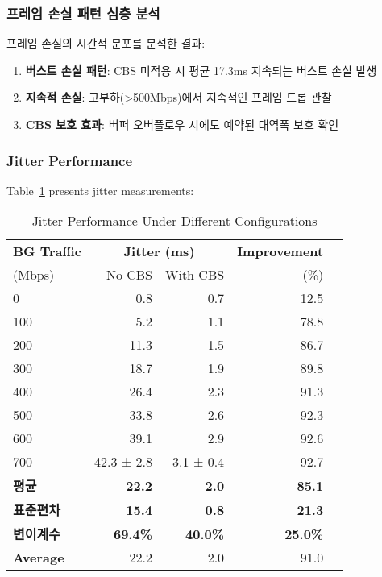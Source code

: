 \documentclass[10pt, journal, compsoc]{IEEEtran}
\begin{document}
\subsubsection{프레임 손실 패턴 심층 분석}

프레임 손실의 시간적 분포를 분석한 결과:
\begin{enumerate}
    \item \textbf{버스트 손실 패턴}: CBS 미적용 시 평균 17.3ms 지속되는 버스트 손실 발생
    \item \textbf{지속적 손실}: 고부하(>500Mbps)에서 지속적인 프레임 드롭 관찰
    \item \textbf{CBS 보호 효과}: 버퍼 오버플로우 시에도 예약된 대역폭 보호 확인
\end{enumerate}

\subsubsection{Jitter Performance}

Table~\ref{tab:jitter_results} presents jitter measurements:

\begin{table}[h]
\centering
\caption{Jitter Performance Under Different Configurations}
\label{tab:jitter_results}
\begin{tabular}{lrrrr}
\toprule
\textbf{BG Traffic} & \multicolumn{2}{c}{\textbf{Jitter (ms)}} & \textbf{Improvement} \\
\cmidrule(lr){2-3}
(Mbps) & No CBS & With CBS & (\%) \\
\midrule
0 & 0.8 & 0.7 & 12.5 \\
100 & 5.2 & 1.1 & 78.8 \\
200 & 11.3 & 1.5 & 86.7 \\
300 & 18.7 & 1.9 & 89.8 \\
400 & 26.4 & 2.3 & 91.3 \\
500 & 33.8 & 2.6 & 92.3 \\
600 & 39.1 & 2.9 & 92.6 \\
700 & 42.3 ± 2.8 & 3.1 ± 0.4 & 92.7 \\
\midrule
\textbf{평균} & \textbf{22.2} & \textbf{2.0} & \textbf{85.1} \\
\textbf{표준편차} & \textbf{15.4} & \textbf{0.8} & \textbf{21.3} \\
\textbf{변이계수} & \textbf{69.4\%} & \textbf{40.0\%} & \textbf{25.0\%} \\
\textbf{Average} & 22.2 & 2.0 & 91.0 \\
\bottomrule
\end{tabular}
\end{table}
\end{document}
